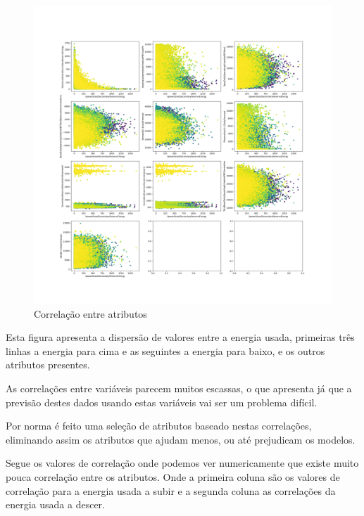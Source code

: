 \begin{figure}[H]
  \centering
  \includegraphics[width=\textwidth]{plots/feature_correlation.png}
  \caption{Correlação entre atributos}
  \label{fig:featurecorrelation}
\end{figure}

Esta figura apresenta a dispersão de valores entre a energia usada, primeiras três linhas a energia para cima e as seguintes a energia para baixo, e os outros atributos presentes.\par
As correlações entre variáveis parecem muitos escassas, o que apresenta já que a previsão destes dados usando estas variáveis vai ser um problema difícil.\par
Por norma é feito uma seleção de atributos baseado nestas correlações, eliminando assim os atributos que ajudam menos, ou até prejudicam os modelos.\par
Segue os valores de correlação onde podemos ver numericamente que existe muito pouca correlação entre os atributos. Onde a primeira coluna são os valores de correlação para a energia usada a subir e a segunda coluna as correlações da energia usada a descer.\par

